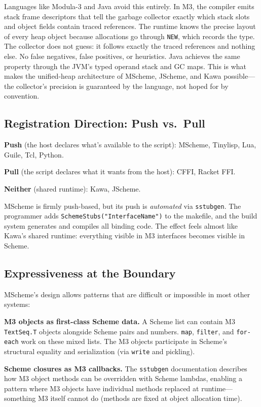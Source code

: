 \documentclass[11pt]{article}
\begin{document}
Languages like Modula-3 and Java avoid this entirely.  In M3, the
compiler emits stack frame descriptors that tell the garbage collector
exactly which stack slots and object fields contain traced references.
The runtime knows the precise layout of every heap object because
allocations go through \texttt{NEW}, which records the type.  The
collector does not guess: it follows exactly the traced references and
nothing else.  No false negatives, false positives, or heuristics.
Java achieves the same property through the JVM's typed operand stack
and GC maps.  This is what makes the unified-heap architecture of
MScheme, JScheme, and Kawa possible---the collector's precision is
guaranteed by the language, not hoped for by convention.


\subsection{Registration Direction: Push vs.\ Pull}
\label{sec:registration}

\textbf{Push} (the host declares what's available to the script):
MScheme, Tinylisp, Lua, Guile, Tcl, Python.

\textbf{Pull} (the script declares what it wants from the host):
CFFI, Racket FFI.

\textbf{Neither} (shared runtime): Kawa, JScheme.

MScheme is firmly push-based, but its push is \emph{automated} via
\texttt{sstubgen}.  The programmer adds
\texttt{SchemeStubs("InterfaceName")} to the makefile, and the build
system generates and compiles all binding code.  The effect feels
almost like Kawa's shared runtime: everything visible in M3 interfaces
becomes visible in Scheme.


\subsection{Expressiveness at the Boundary}
\label{sec:expressiveness}

MScheme's design allows patterns that are difficult or impossible in
most other systems:

\textbf{M3 objects as first-class Scheme data.}  A Scheme list can
contain M3 \texttt{TextSeq.T} objects alongside Scheme pairs and
numbers.  \texttt{map}, \texttt{filter}, and \texttt{for-each} work
on these mixed lists.  The M3 objects participate in Scheme's
structural equality and serialization (via \texttt{write} and
pickling).

\textbf{Scheme closures as M3 callbacks.}  The \texttt{sstubgen}
documentation describes how M3 object methods can be overridden with
Scheme lambdas, enabling a pattern where M3 objects have individual
methods replaced at runtime---something M3 itself cannot do (methods
are fixed at object allocation time).
\end{document}

